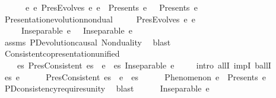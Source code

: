 \begin{isabellebody}
\ \ \ \ \ \ {\isachardoublequoteopen}{\isasymforall}e{}\ e{}{\isachardot}{\kern0pt}\ PresEvolves\ e{}\ e{}\ {\isasymlongrightarrow}\ Presents\ e{}\ {\isasymOmega}\ {\isasymand}\ Presents\ e{}\ {\isasymOmega}{\isachardoublequoteclose}\isanewline
\isanewline
\ \ \isamarkupfalse%
\ Presentation{\isacharunderscore}{\kern0pt}evolution{\isacharunderscore}{\kern0pt}nondual{\isacharcolon}{\kern0pt}\isanewline
\ \ \ \ \ {\isachardoublequoteopen}PresEvolves\ e{}\ e{}{\isachardoublequoteclose}\isanewline
\ \ \ \ \ {\isachardoublequoteopen}Inseparable\ e{}\ {\isasymOmega}\ {\isasymand}\ Inseparable\ e{}\ {\isasymOmega}{\isachardoublequoteclose}\isanewline
%
\isadelimproof
\ \ \ \ %
\endisadelimproof
%
\isatagproof
{}\isamarkupfalse%
\ assms\ PD{}{\isacharunderscore}{\kern0pt}evolution{\isacharunderscore}{\kern0pt}causal\ Nonduality\ \isamarkupfalse%
\ blast%
\endisatagproof
{\isafoldproof}%
%
\isadelimproof
\isanewline
%
\endisadelimproof
\isanewline
\ \ \isamarkupfalse%
\ Consistent{\isacharunderscore}{\kern0pt}copresentation{\isacharunderscore}{\kern0pt}unified{\isacharcolon}{\kern0pt}\isanewline
\ \ \ \ {\isachardoublequoteopen}{\isasymforall}es{\isachardot}{\kern0pt}\ PresConsistent\ es\ {\isasymlongrightarrow}\ {\isacharparenleft}{\kern0pt}{\isasymforall}e\ {\isasymin}\ es{\isachardot}{\kern0pt}\ Inseparable\ e\ {\isasymOmega}{\isacharparenright}{\kern0pt}{\isachardoublequoteclose}\isanewline
%
\isadelimproof
\ \ %
\endisadelimproof
%
\isatagproof
{}\isamarkupfalse%
\ {\isacharparenleft}{\kern0pt}intro\ allI\ impI\ ballI{\isacharparenright}{\kern0pt}\isanewline
\ \ \ \ \isamarkupfalse%
\ es\ e\isanewline
\ \ \ \ \isamarkupfalse%
\ {\isachardoublequoteopen}PresConsistent\ es{\isachardoublequoteclose}\ \ {\isachardoublequoteopen}e\ {\isasymin}\ es{\isachardoublequoteclose}\isanewline
\ \ \ \ \isamarkupfalse%
\ {\isachardoublequoteopen}Phenomenon\ e\ {\isasymand}\ Presents\ e\ {\isasymOmega}{\isachardoublequoteclose}\isanewline
\ \ \ \ \ \ \isamarkupfalse%
\ PD{}{\isacharunderscore}{\kern0pt}consistency{\isacharunderscore}{\kern0pt}requires{\isacharunderscore}{\kern0pt}unity\ \isamarkupfalse%
\ blast\isanewline
\ \ \ \ \isamarkupfalse%
\ {\isachardoublequoteopen}Inseparable\ e\ {\isasymOmega}{\isachardoublequoteclose}\ \isamarkupfalse%

\end{isabellebody}
